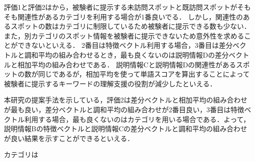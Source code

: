 \documentclass{deimj}
\begin{document}
評価1と評価2はから，被験者に提示する未訪問スポットと既訪問スポットがそもそも関連性があるカテゴリを利用する場合が1番良いでる．
しかし，関連性のあるスポットの数はカテゴリに制限しているため被験者に提示できる数も少ない．
また，別カテゴリのスポット情報を被験者に提示できないため意外性を求めることができないといえる．
2番目は特徴ベクトル利用する場合，3番目は差分ベクトルと調和平均の組み合わせるとき，最も良くないのは説明情報Dの差分ベクトルと相加平均の組み合わせである．
説明情報Cと説明情報Dの関連性があるスポットの数が同じであるが，相加平均を使って単語スコアを算出することによって被験者に提示するキーワードの理解支援の役割が減少したといえる．

本研究の提案手法を示している，評価2は差分ベクトルと相加平均の組み合わせが最も良い，差分ベクトルと調和平均の組み合わせが2番目良い，3番目は特徴ベクトル利用する場合，最も良くないのはカテゴリを用いる場合である．よって，説明情報Bの特徴ベクトルと説明情報Cの差分ベクトルと調和平均の組み合わせが良い結果を示すことができるといえる．

カテゴリは
\end{document}
